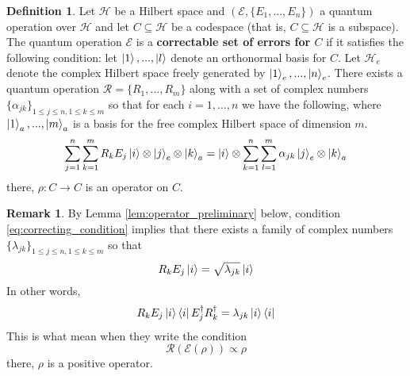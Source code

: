 \documentclass[12pt]{article}
\theoremstyle{plain}
\theoremstyle{definition}
\newtheorem{defn}[thm]{Definition} %
\newtheorem{remark}[thm]{Remark}
\newcommand{\call}[1]{\mathcal{#1}}
\newcommand{\lto}{\longrightarrow}
\begin{document}
	\begin{defn}\label{def:correctable}
		Let $\call{H}$ be a Hilbert space and $(\call{E}, \lbrace E_1,...,E_n\rbrace)$ a quantum operation over $\call{H}$ and let $C \subseteq \call{H}$ be a codespace (that is, $C \subseteq \call{H}$ is a subspace). The quantum operation $\call{E}$ is a \textbf{correctable set of errors for $C$} if it satisfies the following condition: let $\ket{1},...,\ket{l}$ denote an orthonormal basis for $C$. Let $\call{H}_e$ denote the complex Hilbert space freely generated by $\ket{1}_e,...,\ket{n}_e$. There exists a quantum operation $\call{R} = \lbrace R_1,...,R_m\rbrace$ along with a set of complex numbers $\lbrace \alpha_{jk}\rbrace_{1 \leq j \leq n, 1 \leq k \leq m}$ so that for each $i = 1,...,n$ we have the following, where $\ket{1}_a,...,\ket{m}_a$ is a basis for the free complex Hilbert space of dimension $m$.
		\begin{equation}\label{eq:correcting_condition}
			\sum_{j = 1}^n\sum_{k = 1}^m R_k E_j \ket{i} \otimes \ket{j}_e \otimes \ket{k}_a = \ket{i} \otimes \sum_{k = 1}^n \sum_{l = 1}^m \alpha_{jk} \ket{j}_e \otimes \ket{k}_a
		\end{equation}
		there, $\rho: C \lto C$ is an operator on $C$.
	\end{defn}
	\begin{remark}\label{rmk:operator_transition}
		By Lemma \ref{lem:operator_preliminary} below, condition \eqref{eq:correcting_condition} implies that there exists a family of complex numbers $\lbrace \lambda_{jk}\rbrace_{1 \leq j \leq n, 1 \leq k \leq m}$ so that
		\begin{equation}
			R_kE_j\ket{i} = \sqrt{\lambda_{jk}}\ket{i}
		\end{equation}
		In other words,
		\begin{equation}
			R_kE_j \ket{i} \bra{i}E_j^\dagger R_k^\dagger = \lambda_{jk} \ket{i}\bra{i}
		\end{equation}
		This is what \cite{quantum_computing} mean when they write the condition
		\begin{equation}
			\call{R}(\call{E}(\rho)) \propto \rho
		\end{equation}
		there, $\rho$ is a positive operator.
	\end{remark}
\end{document}
